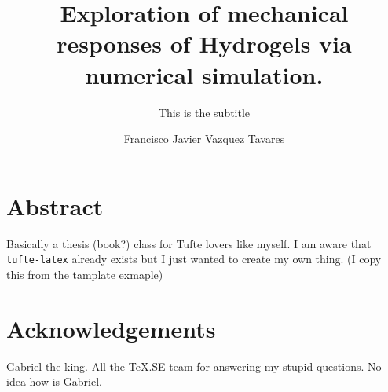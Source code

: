 \documentclass[12pt,colorful,boxey]{tufte-style-thesis}
\author{Francisco Javier Vazquez Tavares}
\title{Exploration of mechanical responses of Hydrogels via numerical simulation.}
\subtitle{This is the subtitle}
\begin{document}
\maketitle

\justifying

\chapter*{Abstract}
Basically a thesis (book?) class for Tufte lovers like myself. 
I am aware that \texttt{tufte-latex} already exists but I just wanted to create my own thing.
(I copy this from the tamplate exmaple)

\chapter*{Acknowledgements}
Gabriel the king. 
All the \href{https://tex.stackexchange.com/}{\TeX.SE} team for answering my stupid questions.
No idea how is Gabriel.

\tableofcontents
\listoffigures
\listoftables
\listoflistings


\mainmatter



\end{document}
